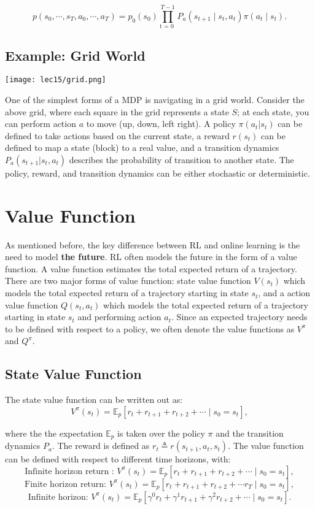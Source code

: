 \documentclass[11pt]{article}
\begin{document}
$$p\left(s_{0}, \cdots, s_{T}, a_{0}, \cdots, a_{T}\right)=p_{0}\left(s_{0}\right) \prod_{\text {t = 0 }}^{T-1} P_a\left(s_{t+1} \mid s_{t}, a_{t}\right) \pi\left(a_{t} \mid s_{t}\right).$$


\subsection{Example: Grid World}
\begin{center}
    \texttt{[image: lec15/grid.png]}    
\end{center}

One of the simplest forms of a MDP is navigating in a grid world. Consider the above grid, where each square in the grid represents a state $S$; at each state, you can perform action $a$ to move (up, down, left right). A policy $\pi(a_t|s_t)$ can be defined to take actions based on the current state, a reward $r(s_t)$ can be defined to map a state (block) to a real value, and a transition dynamics $P_a(s_{t+1} | s_t, a_t)$ describes the probability of transition to another state. The policy, reward, and transition dynamics can be either stochastic or deterministic. 




\section{Value Function}
As mentioned before, the key difference between RL and online learning is the need to model \textbf{the future}. RL often models the future in the form of a value function. A value function estimates the total expected return of a trajectory. There are two major forms of value function: state value function $V(s_t)$ which models the total expected return of a trajectory starting in state $s_t$, and a action value function $Q(s_t, a_t)$ which models the total expected return of a trajectory starting in state $s_t$ and performing action $a_t$. Since an expected trajectory needs to be defined with respect to a policy, we often denote the value functions as $V^\pi$ and $Q^\pi$. 


\subsection{State Value Function}
The state value function can be written out as:
$$V^{\pi}(s_t)=\mathbb{E}_{p}\left[r_{t}+r_{t+1}+r_{t+2}+\cdots \mid s_{0}=s_t\right], $$

where the the expectation $\mathbb E_p$ is taken over the policy $\pi$ and the transition dynamics $P_a$. The reward  is defined as $r_{t} \triangleq r\left(s_{t+1}, a_{t}, s_{t}\right) $. The value function can be defined with respect to different time horizons, with:
$$ \text{Infinite horizon return : } V^{\pi}(s_t)=\mathbb{E}_{p}\left[r_{t}+r_{t+1}+r_{t+2}+\cdots \mid s_{0}=s_t\right],$$
$$ \text{Finite horizon return: } V^{\pi}(s_t)=\mathbb{E}_{p}\left[r_{t}+r_{t+1}+r_{t+2}+\cdots r_{T} \mid s_{0}=s_t\right],$$
$$ \text{Infinite horizon: } V^{\pi}(s_t)=\mathbb{E}_{p}\left[\gamma^{0} r_{t}+\gamma^{1} r_{t+1}+\gamma^{2} r_{t+2}+\cdots \mid s_{0}=s_t\right].$$
\end{document}
